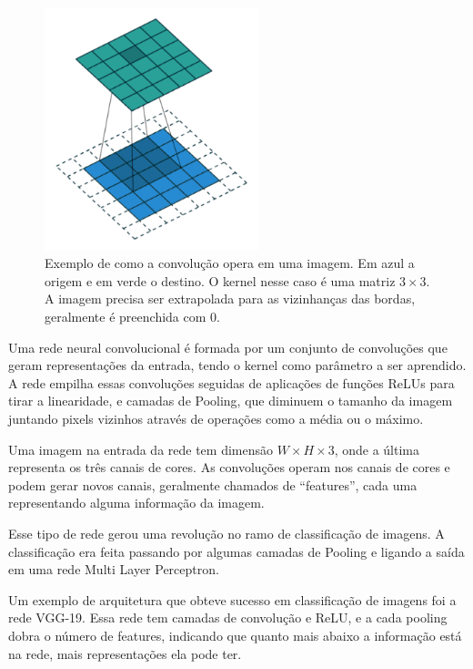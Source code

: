 \begin{figure}[!ht]
	\centering
	\includegraphics[height=200pt]{files/assets/deeplearning/conv.png}
	\caption{Exemplo de como a convolução opera em uma imagem.
	Em azul a origem e em verde o destino. O kernel nesse caso
	é uma matriz $3\times 3$. A imagem precisa ser extrapolada
	para as vizinhanças das bordas, geralmente é preenchida
	com 0.}
	\label{img:preview}
\end{figure}



Uma rede neural convolucional é formada
por um conjunto de convoluções que
geram representações da entrada, 
tendo o kernel como parâmetro a ser aprendido.
A rede empilha essas convoluções seguidas
de aplicações de funções ReLUs para tirar
a linearidade, e camadas de Pooling,
que diminuem o tamanho da imagem
juntando pixels vizinhos através de
operações como a média ou o máximo.


Uma imagem na entrada da rede tem 
dimensão $W\times H \times 3$,
onde a última representa os três
canais de cores.
As convoluções operam nos canais
de cores e podem gerar novos canais,
geralmente chamados de ``features'',
cada uma representando alguma informação
da imagem.


Esse tipo de rede gerou uma revolução
no ramo de classificação de imagens.
A classificação era feita passando
por algumas camadas de Pooling e
ligando a saída em uma rede Multi
Layer Perceptron.

Um exemplo de arquitetura que obteve
sucesso em classificação de imagens
foi a rede VGG-19. Essa rede 
tem camadas de convolução e ReLU,
e a cada pooling dobra o número
de features, indicando que quanto
mais abaixo a informação está na rede,
mais representações ela pode ter.

